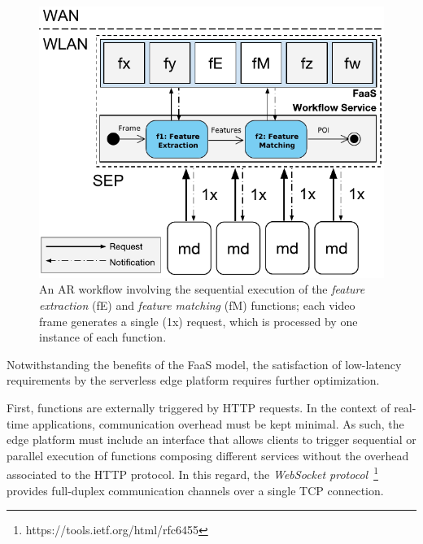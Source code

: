 
\begin{figure}[tbp]
	\centering
	\includegraphics[width=\linewidth]{Figs/Mobile_Computation_Offloading_Workflow.pdf}
	\caption{An AR workflow involving the sequential execution of the \textit{feature extraction} (fE) and \textit{feature matching} (fM) functions; each video frame generates a single (1x) request, which is processed by one instance of each function.} 
	\label{fig:Mobile_Computation_Offloading_Workflow}
\end{figure}

Notwithstanding the benefits of the FaaS model, the satisfaction of low-latency requirements by the serverless edge platform requires further optimization.

First, functions are externally triggered by HTTP requests. In the context of real-time applications, communication overhead must be kept minimal. As such, the edge platform must include an interface that allows clients to trigger sequential or parallel execution of functions composing different services without the overhead associated to the HTTP protocol. In this regard, the \textit{WebSocket protocol}~\footnote{https://tools.ietf.org/html/rfc6455}
provides full-duplex communication channels over a single TCP connection. %


